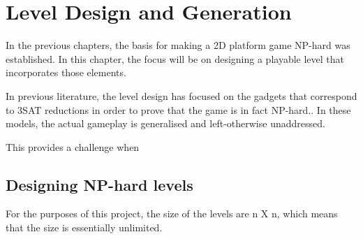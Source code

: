 \documentclass[11pt, a4paper, oneside]{report} %
\begin{document}




\chapter{Level Design and Generation}

In the previous chapters, the basis for making a 2D platform game NP-hard was
established. In this chapter, the focus will be on designing a playable level
that incorporates those elements.

In previous literature, the level design has focused on the gadgets that
correspond to 3SAT reductions in order to prove that the game is in
fact NP-hard.. In these models, the actual gameplay is
generalised and left-otherwise unaddressed.

This provides a challenge when

\section{Designing NP-hard levels}

For the purposes of this project, the size of the levels are n X n, which
means that the size is essentially unlimited.





\end{document}
